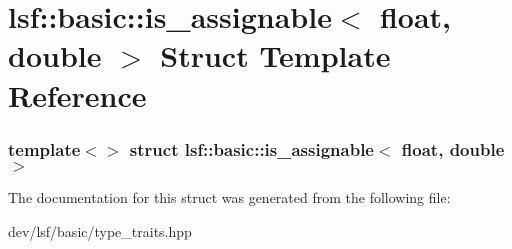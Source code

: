 \hypertarget{structlsf_1_1basic_1_1is__assignable_3_01float_00_01double_01_4}{
\section{lsf::basic::is\_\-assignable$<$ float, double $>$ Struct Template Reference}
\label{structlsf_1_1basic_1_1is__assignable_3_01float_00_01double_01_4}
}
\subsubsection*{template$<$$>$ struct lsf::basic::is\_\-assignable$<$ float, double $>$}



The documentation for this struct was generated from the following file:\begin{DoxyCompactItemize}
\item 
dev/lsf/basic/type\_\-traits.hpp\end{DoxyCompactItemize}
